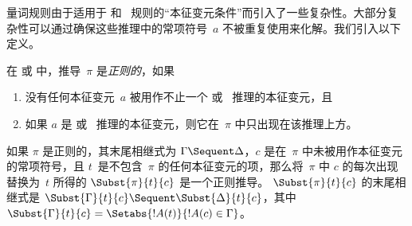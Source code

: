\documentclass[../../../include/open-logic-section]{subfiles}
\begin{document}


量词规则由于适用于 \LeftR{\lexists} 和~\RightR{\lforall} 规则的“本征变元条件”而引入了一些复杂性。大部分复杂性可以通过确保这些推理中的常项符号~$a$ 不被重复使用来化解。我们引入以下定义。

\begin{defn}
在  或  中，推导~$\pi$ 是\emph{正则的}，如果
\begin{enumerate}
  \item 没有任何本征变元~$a$ 被用作不止一个 \LeftR{\lexists} 或~\RightR{\lforall} 推理的本征变元，且
  \item 如果 $a$ 是 \LeftR{\lexists} 或~\RightR{\lforall} 推理的本征变元，则它在~$\pi$ 中只出现在该推理上方。
\end{enumerate}
\end{defn}

\begin{lem} 如果 $\pi$ 是正则的，其末尾相继式为
$\Gamma \Sequent \Delta$，$c$ 是在~$\pi$ 中未被用作本征变元的常项符号，且 $t$~是不包含~$\pi$ 的任何本征变元的项，那么将~$\pi$ 中 $c$ 的每次出现替换为~$t$ 所得的 $\Subst{\pi}{t}{c}$ 是一个正则推导。
$\Subst{\pi}{t}{c}$ 的末尾相继式是 $\Subst{\Gamma}{t}{c}
\Sequent \Subst{\Delta}{t}{c}$，其中 $\Subst{\Gamma}{t}{c} =
\Setabs{!A(t)}{!A(c) \in \Gamma}$。
\end{lem}
\end{document}
